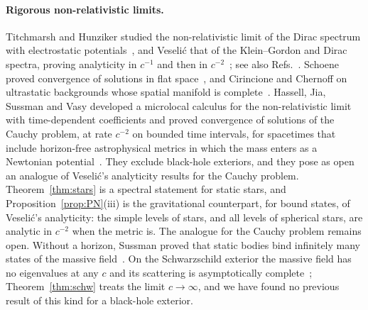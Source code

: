 \documentclass[%
 aip,
 jmp,
 amsmath,amssymb,
 reprint, onecolumn
]{revtex4-1}
\theoremstyle{definition}
\theoremstyle{remark}
\begin{document}
\paragraph{Rigorous non-relativistic limits.} Titchmarsh and Hunziker
studied the non-relativistic limit of the Dirac spectrum with
electrostatic potentials~\cite{Titchmarsh1962,Hunziker1975}, and
Veseli\'c that of the Klein--Gordon and Dirac spectra, proving
analyticity in $c^{-1}$ and then in $c^{-2}$~\cite{Veselic1970,
Veselic1971,Veselic1983}; see also
Refs.~.
Schoene proved convergence of solutions in flat
space~\cite{Schoene1979}, and Cirincione and Chernoff on ultrastatic
backgrounds whose spatial manifold is complete~\cite{CirincioneChernoff1981}.
Hassell, Jia, Sussman and Vasy developed a microlocal calculus for the
non-relativistic limit with time-dependent coefficients and proved
convergence of solutions of the Cauchy problem, at rate $c^{-2}$ on
bounded time intervals, for spacetimes that include horizon-free
astrophysical metrics in which the mass enters as a Newtonian
potential~\cite{HassellJiaSussmanVasy2025a,HassellJiaSussmanVasy2025b}.
They exclude black-hole exteriors, and they pose as open an analogue of
Veseli\'c's analyticity results for the Cauchy problem.
Theorem~\ref{thm:stars} is a spectral statement for static stars, and
Proposition~\ref{prop:PN}(iii) is the gravitational counterpart, for bound
states, of Veseli\'c's analyticity: the simple levels of stars, and all
levels of spherical stars, are analytic in $c^{-2}$ when the metric
is. The analogue for the Cauchy problem remains
open. Without a
horizon, Sussman proved that static bodies bind infinitely many states
of the massive field~\cite{Sussman2024}. On the Schwarzschild exterior
the massive field has no eigenvalues at any $c$ and its scattering is
asymptotically complete~\cite{Bachelot1994}; Theorem~\ref{thm:schw}
treats the limit $c\to\infty$, and we have found no previous result of
this kind for a black-hole exterior.
\end{document}
